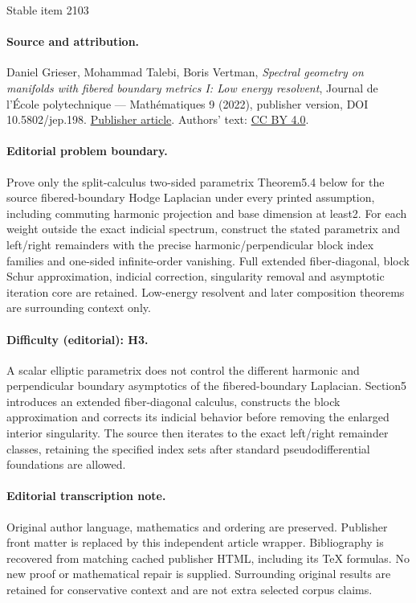 \documentclass[11pt]{article}
\numberwithin{equation}{section}
\theoremstyle{plain}
\theoremstyle{definition}
\begin{document}
\begin{center}{\Large Stable item 2103}\end{center}
\paragraph{Source and attribution.}
Daniel Grieser, Mohammad Talebi, Boris Vertman, \emph{Spectral geometry on manifolds with fibered boundary metrics I: Low energy resolvent}, Journal de l’École polytechnique — Mathématiques 9 (2022), publisher version, DOI 10.5802/jep.198. \href{https://jep.centre-mersenne.org/articles/10.5802/jep.198/}{Publisher article}. Authors' text: \href{https://creativecommons.org/licenses/by/4.0/}{CC BY 4.0}.
\paragraph{Editorial problem boundary.}
Prove only the split-calculus two-sided parametrix Theorem5.4 below for the source fibered-boundary Hodge Laplacian under every printed assumption, including commuting harmonic projection and base dimension at least2. For each weight outside the exact indicial spectrum, construct the stated parametrix and left/right remainders with the precise harmonic/perpendicular block index families and one-sided infinite-order vanishing. Full extended fiber-diagonal, block Schur approximation, indicial correction, singularity removal and asymptotic iteration core are retained. Low-energy resolvent and later composition theorems are surrounding context only.
\paragraph{Difficulty (editorial): H3.}
A scalar elliptic parametrix does not control the different harmonic and perpendicular boundary asymptotics of the fibered-boundary Laplacian. Section5 introduces an extended fiber-diagonal calculus, constructs the block approximation and corrects its indicial behavior before removing the enlarged interior singularity. The source then iterates to the exact left/right remainder classes, retaining the specified index sets after standard pseudodifferential foundations are allowed.
\paragraph{Editorial transcription note.}
Original author language, mathematics and ordering are preserved. Publisher front matter is replaced by this independent article wrapper. Bibliography is recovered from matching cached publisher HTML, including its TeX formulas. No new proof or mathematical repair is supplied. Surrounding original results are retained for conservative context and are not extra selected corpus claims.
\clearpage
\end{document}
